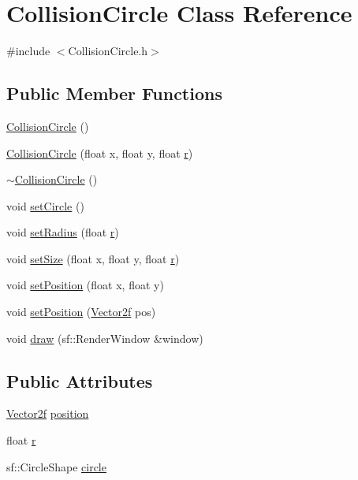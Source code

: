 \hypertarget{class_collision_circle}{}\section{Collision\+Circle Class Reference}
\label{class_collision_circle}


{\ttfamily \#include $<$Collision\+Circle.\+h$>$}

\subsection*{Public Member Functions}
\begin{DoxyCompactItemize}
\item 
\mbox{\hyperlink{class_collision_circle_af28b6b0e7d28c4387b54c80de3226416}{Collision\+Circle}} ()
\item 
\mbox{\hyperlink{class_collision_circle_a8d3768061f099bbfee5a840a59429a17}{Collision\+Circle}} (float x, float y, float \mbox{\hyperlink{class_collision_circle_a7f23e968ae19c24c7ca568875b5dd20b}{r}})
\item 
\mbox{\hyperlink{class_collision_circle_afb0871cc98c2402d5648772bb2bd3b0c}{$\sim$\+Collision\+Circle}} ()
\item 
void \mbox{\hyperlink{class_collision_circle_aa6d2172fb25f3026bc1723790d6fc936}{set\+Circle}} ()
\item 
void \mbox{\hyperlink{class_collision_circle_ace1c0c0970e8a8aed1d9d410c89c1da2}{set\+Radius}} (float \mbox{\hyperlink{class_collision_circle_a7f23e968ae19c24c7ca568875b5dd20b}{r}})
\item 
void \mbox{\hyperlink{class_collision_circle_acc3b5cacacc55933ab14f353793c9d8b}{set\+Size}} (float x, float y, float \mbox{\hyperlink{class_collision_circle_a7f23e968ae19c24c7ca568875b5dd20b}{r}})
\item 
void \mbox{\hyperlink{class_collision_circle_a2ea64c14b34de9adde37518dbec4fa55}{set\+Position}} (float x, float y)
\item 
void \mbox{\hyperlink{class_collision_circle_a60c6d03a10c1ac88231afaf4237bf366}{set\+Position}} (\mbox{\hyperlink{class_vector2f}{Vector2f}} pos)
\item 
void \mbox{\hyperlink{class_collision_circle_a7f743d977b9208d0d448c284c765f729}{draw}} (sf\+::\+Render\+Window \&window)
\end{DoxyCompactItemize}
\subsection*{Public Attributes}
\begin{DoxyCompactItemize}
\item 
\mbox{\hyperlink{class_vector2f}{Vector2f}} \mbox{\hyperlink{class_collision_circle_aa4e6b93eba15c97b3253dd4518fbcc30}{position}}
\item 
float \mbox{\hyperlink{class_collision_circle_a7f23e968ae19c24c7ca568875b5dd20b}{r}}
\item 
sf\+::\+Circle\+Shape \mbox{\hyperlink{class_collision_circle_ad75e824f03cb2854683bb46c1119d6b3}{circle}}
\end{DoxyCompactItemize}


